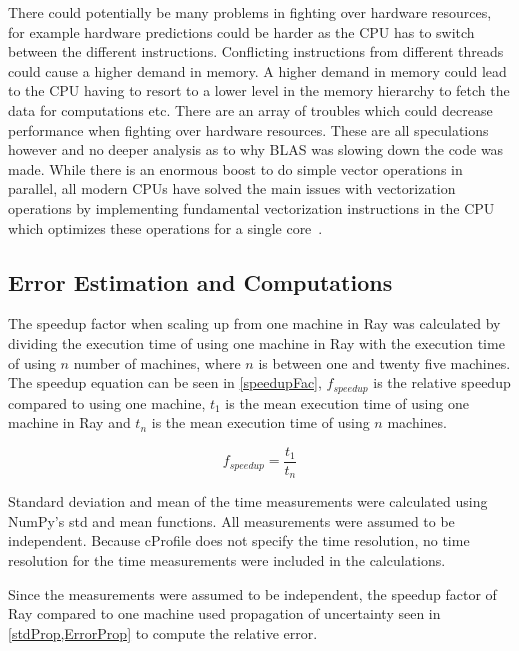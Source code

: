 \documentclass[12pt, a4paper]{article}
\begin{document}
There could potentially be many problems in fighting over hardware resources, for example hardware predictions could be harder as the CPU has to switch between the different instructions.
Conflicting instructions from different threads could cause a higher demand in memory.
A higher demand in memory could lead to the CPU having to resort to a lower level in the memory hierarchy to fetch the data for computations etc. 
There are an array of troubles which could decrease performance when fighting over hardware resources.
These are all speculations however and no deeper analysis as to why BLAS was slowing down the code was made.
While there is an enormous boost to do simple vector operations in parallel, all modern CPUs have solved the main issues with vectorization operations by implementing fundamental vectorization instructions in the CPU which optimizes these operations for a single core~\cite{enwiki:avx}.

\subsection{Error Estimation and Computations}

The speedup factor when scaling up from one machine in Ray was calculated by dividing the execution time of using one machine in Ray with the execution time of using $n$ number of machines, where $n$ is between one and twenty five machines.
The speedup equation can be seen in \cref{speedupFac}, $f_{speedup}$ is the relative speedup compared to using one machine, $t_1$ is the mean execution time of using one machine in Ray and $t_n$ is the mean execution time of using $n$ machines.

\begin{equation}\label{speedupFac}
    f_{speedup} = \frac{t_1}{t_n}
\end{equation}

Standard deviation and mean of the time measurements were calculated using NumPy's std and mean functions.
All measurements were assumed to be independent.
Because cProfile does not specify the time resolution, no time resolution for the time measurements were included in the calculations.

Since the measurements were assumed to be independent, the speedup factor of Ray compared to one machine used propagation of uncertainty seen in \cref{stdProp,ErrorProp} to compute the relative error.
\end{document}
